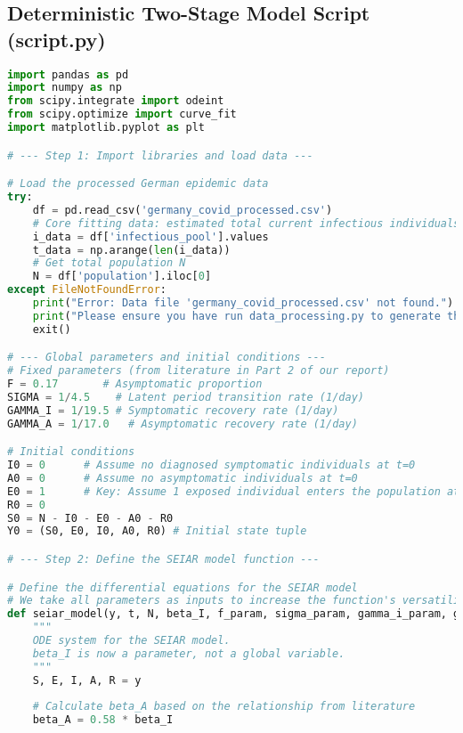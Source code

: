 \subsection{Deterministic Two-Stage Model Script (script.py)}
\begin{lstlisting}[language=Python, caption={Python script for fitting a two-stage piecewise deterministic SEIAR model, corresponding to the pre- and post-lockdown phases.}]
import pandas as pd
import numpy as np
from scipy.integrate import odeint
from scipy.optimize import curve_fit
import matplotlib.pyplot as plt

# --- Step 1: Import libraries and load data ---

# Load the processed German epidemic data
try:
    df = pd.read_csv('germany_covid_processed.csv')
    # Core fitting data: estimated total current infectious individuals
    i_data = df['infectious_pool'].values
    t_data = np.arange(len(i_data))
    # Get total population N
    N = df['population'].iloc[0]
except FileNotFoundError:
    print("Error: Data file 'germany_covid_processed.csv' not found.")
    print("Please ensure you have run data_processing.py to generate this file.")
    exit()

# --- Global parameters and initial conditions ---
# Fixed parameters (from literature in Part 2 of our report)
F = 0.17       # Asymptomatic proportion
SIGMA = 1/4.5    # Latent period transition rate (1/day)
GAMMA_I = 1/19.5 # Symptomatic recovery rate (1/day)
GAMMA_A = 1/17.0   # Asymptomatic recovery rate (1/day)

# Initial conditions
I0 = 0      # Assume no diagnosed symptomatic individuals at t=0
A0 = 0      # Assume no asymptomatic individuals at t=0
E0 = 1      # Key: Assume 1 exposed individual enters the population at t=0, as the "seed" of the epidemic
R0 = 0
S0 = N - I0 - E0 - A0 - R0
Y0 = (S0, E0, I0, A0, R0) # Initial state tuple

# --- Step 2: Define the SEIAR model function ---

# Define the differential equations for the SEIAR model
# We take all parameters as inputs to increase the function's versatility
def seiar_model(y, t, N, beta_I, f_param, sigma_param, gamma_i_param, gamma_a_param):
    """
    ODE system for the SEIAR model.
    beta_I is now a parameter, not a global variable.
    """
    S, E, I, A, R = y
    
    # Calculate beta_A based on the relationship from literature
    beta_A = 0.58 * beta_I
    

\end{lstlisting}
